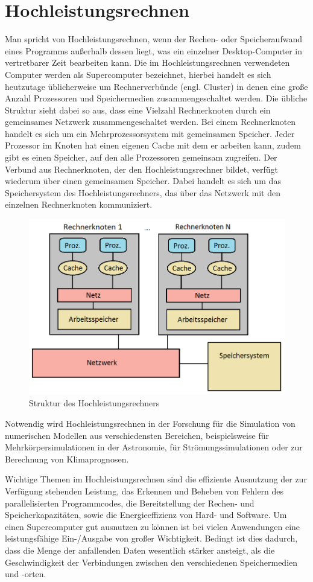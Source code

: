 \documentclass[
	12pt,
	a4paper,
	BCOR10mm,
	DIV14,
	listof=totoc,
	bibliography=totoc,
	headsepline
]{scrreprt}
\begin{document}
\section{Hochleistungsrechnen}
\label{back_hpc}
Man spricht von Hochleistungsrechnen, wenn der Rechen- oder Speicheraufwand eines Programms außerhalb dessen liegt, was ein einzelner Desktop-Computer in vertretbarer Zeit bearbeiten kann.
Die im Hochleistungsrechnen verwendeten Computer werden als Supercomputer bezeichnet, hierbei handelt es sich heutzutage üblicherweise um Rechnerverbünde (engl. Cluster) in denen eine große Anzahl Prozessoren und Speichermedien zusammengeschaltet werden.
Die übliche Struktur sieht dabei so aus, dass eine Vielzahl Rechnerknoten durch ein gemeinsames Netzwerk zusammengeschaltet werden. Bei einem Rechnerknoten handelt es sich um ein Mehrprozessorsystem mit gemeinsamen Speicher. Jeder Prozessor im Knoten hat einen eigenen Cache mit dem er arbeiten kann, zudem gibt es einen Speicher, auf den alle Prozessoren gemeinsam zugreifen. 
Der Verbund aus Rechnerknoten, der den Hochleistungsrechner bildet, verfügt wiederum über einen gemeinsamen Speicher. Dabei handelt es sich um das Speichersystem des Hochleistungsrechners, das über das Netzwerk mit den einzelnen Rechnerknoten kommuniziert.
\begin{figure}[h]
	\begin{center}
		\includegraphics[width=.43\textwidth]{Bilder/rechnerknoten.png}
	\end{center}
	\caption{Struktur des Hochleistungsrechners}
	\label{fig:rechnerknoten}
\end{figure}

Notwendig wird Hochleistungsrechnen in der Forschung für die Simulation von numerischen Modellen aus verschiedensten Bereichen, beispielsweise für Mehrkörpersimulationen in der Astronomie, für Strömungssimulationen oder zur Berechnung von Klimaprognosen.
\medskip

Wichtige Themen im Hochleistungsrechnen sind die effiziente Ausnutzung der zur Verfügung stehenden Leistung, das Erkennen und Beheben von Fehlern des parallelisierten Programmcodes, die Bereitstellung der Rechen- und Speicherkapazitäten, sowie die Energieeffizienz von Hard- und Software.
Um einen Supercomputer gut ausnutzen zu können ist bei vielen Anwendungen eine leistungsfähige Ein-/Ausgabe von großer Wichtigkeit. Bedingt ist dies dadurch, dass die Menge der anfallenden Daten wesentlich stärker ansteigt, als die Geschwindigkeit der Verbindungen zwischen den verschiedenen Speichermedien und -orten.
\end{document}
